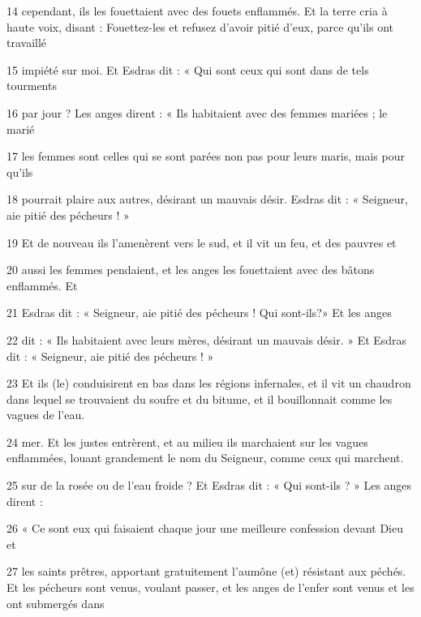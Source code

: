 \par 14 cependant, ils les fouettaient avec des fouets enflammés. Et la terre cria à haute voix, disant : Fouettez-les et refusez d'avoir pitié d'eux, parce qu'ils ont travaillé

\par 15 impiété sur moi. Et Esdras dit : « Qui sont ceux qui sont dans de tels tourments

\par 16 par jour ? Les anges dirent : « Ils habitaient avec des femmes mariées ; le marié

\par 17 les femmes sont celles qui se sont parées non pas pour leurs maris, mais pour qu'ils

\par 18 pourrait plaire aux autres, désirant un mauvais désir. Esdras dit : « Seigneur, aie pitié des pécheurs ! »

\par 19 Et de nouveau ils l'amenèrent vers le sud, et il vit un feu, et des pauvres et

\par 20 aussi les femmes pendaient, et les anges les fouettaient avec des bâtons enflammés. Et

\par 21 Esdras dit : « Seigneur, aie pitié des pécheurs ! Qui sont-ils?» Et les anges

\par 22 dit : « Ils habitaient avec leurs mères, désirant un mauvais désir. » Et Esdras dit : « Seigneur, aie pitié des pécheurs ! »

\par 23 Et ils (le) conduisirent en bas dans les régions infernales, et il vit un chaudron dans lequel se trouvaient du soufre et du bitume, et il bouillonnait comme les vagues de l'eau.

\par 24 mer. Et les justes entrèrent, et au milieu ils marchaient sur les vagues enflammées, louant grandement le nom du Seigneur, comme ceux qui marchent.

\par 25 sur de la rosée ou de l'eau froide ? Et Esdras dit : « Qui sont-ils ? » Les anges dirent :
\par 26 « Ce sont eux qui faisaient chaque jour une meilleure confession devant Dieu et

\par 27 les saints prêtres, apportant gratuitement l'aumône (et) résistant aux péchés. Et les pécheurs sont venus, voulant passer, et les anges de l'enfer sont venus et les ont submergés dans

